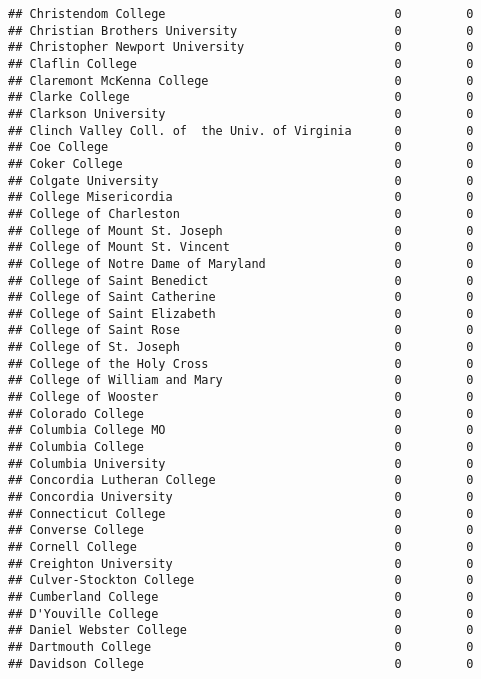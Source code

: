 \documentclass[
]{article}
\begin{document}
\begin{verbatim}
## Christendom College                                0         0
## Christian Brothers University                      0         0
## Christopher Newport University                     0         0
## Claflin College                                    0         0
## Claremont McKenna College                          0         0
## Clarke College                                     0         0
## Clarkson University                                0         0
## Clinch Valley Coll. of  the Univ. of Virginia      0         0
## Coe College                                        0         0
## Coker College                                      0         0
## Colgate University                                 0         0
## College Misericordia                               0         0
## College of Charleston                              0         0
## College of Mount St. Joseph                        0         0
## College of Mount St. Vincent                       0         0
## College of Notre Dame of Maryland                  0         0
## College of Saint Benedict                          0         0
## College of Saint Catherine                         0         0
## College of Saint Elizabeth                         0         0
## College of Saint Rose                              0         0
## College of St. Joseph                              0         0
## College of the Holy Cross                          0         0
## College of William and Mary                        0         0
## College of Wooster                                 0         0
## Colorado College                                   0         0
## Columbia College MO                                0         0
## Columbia College                                   0         0
## Columbia University                                0         0
## Concordia Lutheran College                         0         0
## Concordia University                               0         0
## Connecticut College                                0         0
## Converse College                                   0         0
## Cornell College                                    0         0
## Creighton University                               0         0
## Culver-Stockton College                            0         0
## Cumberland College                                 0         0
## D'Youville College                                 0         0
## Daniel Webster College                             0         0
## Dartmouth College                                  0         0
## Davidson College                                   0         0

\end{verbatim}
\end{document}
